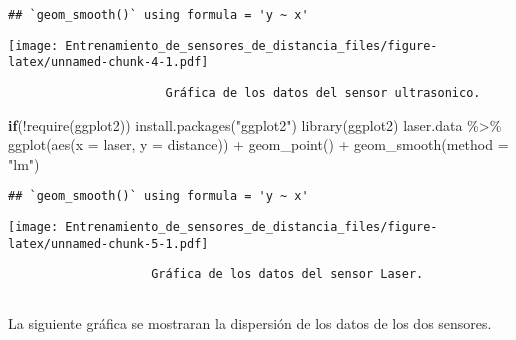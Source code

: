 \documentclass[
]{article}
\newenvironment{Shaded}{\begin{snugshade}}{\end{snugshade}}
\newcommand{\AttributeTok}[1]{\textcolor[rgb]{0.77,0.63,0.00}{#1}}
\newcommand{\ControlFlowTok}[1]{\textcolor[rgb]{0.13,0.29,0.53}{\textbf{#1}}}
\newcommand{\FunctionTok}[1]{\textcolor[rgb]{0.00,0.00,0.00}{#1}}
\newcommand{\NormalTok}[1]{#1}
\newcommand{\SpecialCharTok}[1]{\textcolor[rgb]{0.00,0.00,0.00}{#1}}
\newcommand{\StringTok}[1]{\textcolor[rgb]{0.31,0.60,0.02}{#1}}
\begin{document}
\begin{verbatim}
## `geom_smooth()` using formula = 'y ~ x'
\end{verbatim}

\texttt{[image: Entrenamiento\_de\_sensores\_de\_distancia\_files/figure-latex/unnamed-chunk-4-1.pdf]}

\begin{verbatim}
                      Gráfica de los datos del sensor ultrasonico. 
\end{verbatim}

\begin{Shaded}
\begin{Highlighting}[]
\ControlFlowTok{if}\NormalTok{(}\SpecialCharTok{!}\FunctionTok{require}\NormalTok{(ggplot2))}
  \FunctionTok{install.packages}\NormalTok{(}\StringTok{"ggplot2"}\NormalTok{)}
\FunctionTok{library}\NormalTok{(ggplot2)}
\NormalTok{laser.data }\SpecialCharTok{\%\textgreater{}\%} 
    \FunctionTok{ggplot}\NormalTok{(}\FunctionTok{aes}\NormalTok{(}\AttributeTok{x =}\NormalTok{ laser, }\AttributeTok{y =}\NormalTok{ distance)) }\SpecialCharTok{+}
    \FunctionTok{geom\_point}\NormalTok{() }\SpecialCharTok{+}
    \FunctionTok{geom\_smooth}\NormalTok{(}\AttributeTok{method =} \StringTok{"lm"}\NormalTok{)}
\end{Highlighting}
\end{Shaded}

\begin{verbatim}
## `geom_smooth()` using formula = 'y ~ x'
\end{verbatim}

\texttt{[image: Entrenamiento\_de\_sensores\_de\_distancia\_files/figure-latex/unnamed-chunk-5-1.pdf]}

\begin{verbatim}
                    Gráfica de los datos del sensor Laser.
                    
\end{verbatim}

La siguiente gráfica se mostraran la dispersión de los datos de los dos
sensores.
\end{document}
